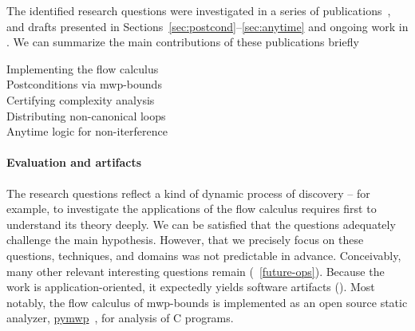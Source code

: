 The identified research questions were investigated in a series of publications~\cite{aubert20222,aubert20232,aubert2023b}, and drafts presented in Sections~\ref{sec:postcond}--\ref{sec:anytime} and ongoing work in \cite{aubert20231}.
We can summarize the main contributions of these publications briefly
\begin{description}
    \item[Implementing the flow calculus] \lipsum[1][1-3]
    \item[Postconditions via mwp-bounds] \lipsum[1][1-3]
    \item[Certifying complexity analysis] \lipsum[1][1-3]
    \item[Distributing non-canonical loops] \lipsum[1][1-3]
    \item[Anytime logic for non-iterference] \lipsum[1][1-3]
\end{description}

\paragraph{Evaluation and artifacts}
The research questions reflect a kind of dynamic process of discovery --
for example, to investigate the applications of the flow calculus requires first to understand its theory deeply.
We can be satisfied that the questions adequately challenge the main hypothesis.
However, that we precisely focus on these questions, techniques, and domains was not predictable in advance.
Conceivably, many other relevant interesting questions remain (\cf~\autoref{future-ops}).
Because the work is application-oriented, it expectedly yields software artifacts ().
Most notably, the flow calculus of mwp-bounds is implemented as an open source static analyzer,
\href{https://statycc.github.io/pymwp}{pymwp}~\cite{aubert2023b}, for analysis of C programs.

